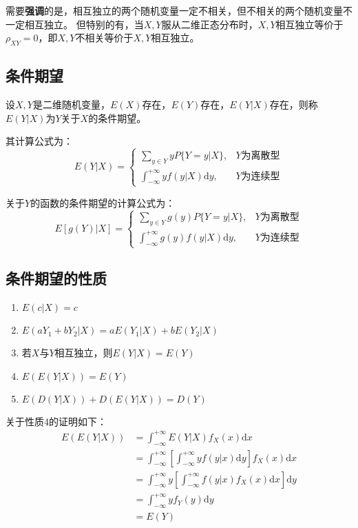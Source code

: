 \documentclass[a4paper,12pt]{ctexart}
\begin{document}
需要\textbf{强调}的是，相互独立的两个随机变量一定不相关，但不相关的两个随机变量不一定相互独立。
但特别的有，当$X,Y$服从二维正态分布时，$X,Y$相互独立等价于$\rho_{XY} = 0$，即$X,Y$不相关等价于$X,Y$相互独立。

\subsection{条件期望}

设$X,Y$是二维随机变量，$E(X)$存在，$E(Y)$存在，$E(Y|X)$存在，则称$E(Y|X)$为$Y$关于$X$的条件期望。

其计算公式为：
\begin{equation*}
	E(Y|X) = \begin{cases}
		\sum_{y\in Y}yP\{Y = y|X\}, & Y\text{为离散型} \\
		\int_{-\infty}^{+\infty}yf(y|X)\mathrm{d}y, & Y\text{为连续型}
	\end{cases}
\end{equation*}

关于$Y$的函数的条件期望的计算公式为：
\begin{equation*}
	E[g(Y)|X] = \begin{cases}
		\sum_{y\in Y}g(y)P\{Y = y|X\}, & Y\text{为离散型} \\
		\int_{-\infty}^{+\infty}g(y)f(y|X)\mathrm{d}y, & Y\text{为连续型}
	\end{cases}
\end{equation*}

\subsection{条件期望的性质}

\begin{enumerate}
	\item $E(c|X) = c$
	\item $E(aY_1 + bY_2|X) = aE(Y_1|X) + bE(Y_2|X)$
	\item 若$X$与$Y$相互独立，则$E(Y|X) = E(Y)$
	\item $E(E(Y|X)) = E(Y)$
	\item $E(D(Y|X)) + D(E(Y|X)) = D(Y)$
\end{enumerate}

关于性质4的证明如下：
\begin{align*}
	E(E(Y|X)) &= \int_{-\infty}^{+\infty}E(Y|X)f_X(x)\mathrm{d}x \\
	&= \int_{-\infty}^{+\infty}\left[\int_{-\infty}^{+\infty}yf(y|x)\mathrm{d}y\right]f_X(x)\mathrm{d}x \\
	&= \int_{-\infty}^{+\infty} y \left[\int_{-\infty}^{+\infty}f(y|x)f_X(x)\mathrm{d}x\right]\mathrm{d}y \\
	&= \int_{-\infty}^{+\infty} y f_Y(y)\mathrm{d}y \\
	&= E(Y)
\end{align*}
\end{document}
